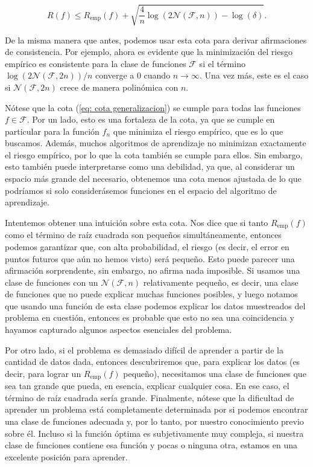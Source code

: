 \documentclass{report}
\begin{document}
\begin{equation}
    R(f) \leq R_{\text{emp}}(f) + \sqrt{\frac{4}{n} \log(2\mathcal{N}(\mathcal{F}, n)) - \log(\delta)}. \label{eq: cota generalizacion}
\end{equation}
\newline

De la misma manera que antes, podemos usar esta cota para derivar afirmaciones de consistencia. Por ejemplo, 
ahora es evidente que la minimización del riesgo empírico es consistente para la clase de funciones \(\mathcal{F}\) 
si el término \(\log(2\mathcal{N}(\mathcal{F}, 2n))/n\) converge a \(0\) cuando \(n \to \infty\). Una vez más, 
este es el caso si \(\mathcal{N}(\mathcal{F}, 2n)\) crece de manera polinómica con \(n\).\newline

Nótese que la cota (\ref{eq: cota generalizacion}) se cumple para todas las funciones \(f \in \mathcal{F}\). 
Por un lado, esto es una fortaleza 
de la cota, ya que se cumple en particular para la función \(f_n\) que minimiza el riesgo empírico, que es lo que 
buscamos. Además, muchos algoritmos de aprendizaje no minimizan exactamente el riesgo empírico, por lo que la cota 
también se cumple para ellos. Sin embargo, esto también puede interpretarse como una debilidad, ya que, al considerar 
un espacio más grande del necesario, obtenemos una cota menos ajustada de lo que podríamos si solo considerásemos
funciones en el espacio del algoritmo de aprendizaje.\newline

Intentemos obtener una intuición sobre esta cota. Nos dice que si tanto \(R_{\text{emp}}(f)\) como el término 
de raíz cuadrada son pequeños simultáneamente, entonces podemos garantizar que, con alta probabilidad, el 
riesgo (es decir, el error en puntos futuros que aún no hemos visto) será pequeño. Esto puede parecer una 
afirmación sorprendente, sin embargo, no afirma nada imposible. Si usamos una clase de funciones con un 
\(\mathcal{N}(\mathcal{F}, n)\) relativamente pequeño, es decir, una clase de funciones que no puede explicar 
muchas funciones posibles, y luego notamos que usando una función de esta clase podemos explicar los datos muestreados 
del problema en cuestión, entonces es probable que esto no sea una coincidencia y hayamos capturado algunos aspectos 
esenciales del problema. \newline

Por otro lado, si el problema es demasiado difícil de aprender a partir de la cantidad de datos dada, entonces 
descubriremos que, para explicar los datos (es decir, para lograr un \(R_{\text{emp}}(f)\) pequeño), necesitamos 
una clase de funciones que sea tan grande que pueda, en esencia, explicar cualquier cosa. En ese caso, el término 
de raíz cuadrada sería grande. Finalmente, nótese que la dificultad de aprender un problema está completamente 
determinada por si podemos encontrar una clase de funciones adecuada y, por lo tanto, por nuestro conocimiento 
previo sobre él. Incluso si la función óptima es subjetivamente muy compleja, si nuestra clase de funciones 
contiene esa función y pocas o ninguna otra, estamos en una excelente posición para aprender.\\
\end{document}

